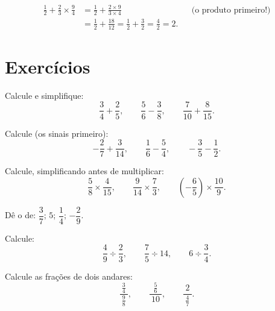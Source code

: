 \begin{example}\label{ex:g8:fractions:mixed}
\begin{align*}
\frac12 + \frac{2}{3} \times \frac{9}{4}
&= \frac12 + \frac{2 \times 9}{3 \times 4}
&& \text{(o produto primeiro!)} \\
&= \frac12 + \frac{18}{12} = \frac12 + \frac32
= \frac{4}{2} = 2 .
\end{align*}
\end{example}

\section{Exercícios}

\begin{exercise}[$\star$]\label{exo:g8:fractions:1}
Calcule e simplifique:
\[
\frac{3}{4} + \frac{2}{5}, \qquad
\frac{5}{6} - \frac{3}{8}, \qquad
\frac{7}{10} + \frac{8}{15} .
\]
\end{exercise}

\begin{exercise}[$\star$]\label{exo:g8:fractions:2}
Calcule (os sinais primeiro):
\[
-\frac{2}{7} + \frac{3}{14}, \qquad
\frac{1}{6} - \frac{5}{4}, \qquad
-\frac{3}{5} - \frac{1}{2} .
\]
\end{exercise}

\begin{exercise}[$\star$]\label{exo:g8:fractions:3}
Calcule, simplificando antes de multiplicar:
\[
\frac{5}{8} \times \frac{4}{15}, \qquad
\frac{9}{14} \times \frac{7}{3}, \qquad
\left(-\frac{6}{5}\right) \times \frac{10}{9} .
\]
\end{exercise}

\begin{exercise}[$\star$]\label{exo:g8:fractions:4}
Dê o  de: $\dfrac{3}{7}$; \quad $5$; \quad
$\dfrac{1}{4}$; \quad $-\dfrac{2}{9}$.
\end{exercise}

\begin{exercise}[$\star$]\label{exo:g8:fractions:5}
Calcule:
\[
\frac{4}{9} \div \frac{2}{3}, \qquad
\frac{7}{5} \div 14, \qquad
6 \div \frac{3}{4} .
\]
\end{exercise}

\begin{exercise}[$\star$]\label{exo:g8:fractions:6}
Calcule as frações de dois andares:
\[
\frac{\ \frac{3}{4}\ }{\ \frac{9}{8}\ },
\qquad
\frac{\ \frac{5}{6}\ }{\ 10\ },
\qquad
\frac{\ 2\ }{\ \frac{4}{7}\ } .
\]
\end{exercise}

